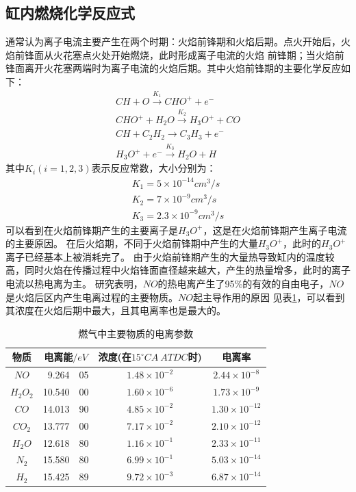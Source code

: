 \subsection{缸内燃烧化学反应式}
通常认为离子电流主要产生在两个时期：火焰前锋期和火焰后期。点火开始后，火焰前锋面从火花塞点火处开始燃烧，此时形成离子电流的火焰
前锋期；当火焰前锋面离开火花塞两端时为离子电流的火焰后期\cite{ljw2004phd}。其中火焰前锋期的主要化学反应如下：
\begin{align}
CH+O\stackrel{K_{1}}{\longrightarrow}CHO^{+}+e^{-}\\
CHO^{+}+H_{2}O\stackrel{K_{2}}{\longrightarrow}H_{3}O^{+}+CO\\
CH+C_{2}H_{2}\stackrel{}{\longrightarrow}C_{3}H_{3}+e^{-}\\
H_{3}O^{+}+e^{-}\stackrel{K_{3}}{\longrightarrow}H_{2}O+H
\end{align}
其中$K_{i}(i=1,2,3)$表示反应常数，大小分别为：
\begin{align}
K_{1}=5\times10^{-14}cm^{3}/s\\
K_{2}=7\times10^{-9}cm^{3}/s\\
K_{3}=2.3\times10^{-9}cm^{3}/s
\end{align}
可以看到在火焰前锋期产生的主要离子是$H_{3}O^{+}$，这是在火焰前锋期产生离子电流的主要原因。
在后火焰期，不同于火焰前锋期中产生的大量$H_{3}O^{+}$，此时的$H_{3}O^{+}$离子已经基本上被消耗完了。
由于火焰前锋期产生的大量热导致缸内的温度较高，同时火焰在传播过程中火焰锋面直径越来越大，产生的热量增多，此时的离子电流以热电离为主。
研究表明\cite{reinmann1997local}，$NO$的热电离产生了95\%的有效的自由电子，$NO$是火焰后区内产生电离过程的主要物质。$NO$起主导作用的原因
见表\ref{tab:nozx}，可以看到其浓度在火焰后期中最大，且其电离率也是最大的。
\begin{table}[!h]
	\centering
	\caption{燃气中主要物质的电离参数}
	\label{tab:nozx}
	\begin{tabular}{|c|rl|c|c|}
		\hline
		物质			    &    \multicolumn{2}{c|}{电离能$/eV$}    &    浓度(在$15^{\circ} CA\ ATDC$时)    &    电离率\\\hline
		$NO$    		&   9.264&05     	&$1.48 \times 10^{-2}$  &  $2.44 \times 10^{-8}$\\\hline
		$H_{2}O_{2}$    &   10.540&00 		&$1.60 \times 10^{-6}$  & $1.73 \times 10^{-9}$\\\hline
		$CO$			&	14.013&90		&$4.85 \times 10^{-2}$	& $1.30 \times 10^{-12}$\\\hline
		$CO_{2}$		&	13.777&00		&$7.17 \times 10^{-2}$	& $2.10 \times 10^{-12}$\\\hline
		$H_{2}O$		&	12.618&80		&$1.16 \times 10^{-1}$	& $2.33 \times 10^{-11}$\\\hline
		$N_{2}$			&	15.580&80		&$6.99 \times 10^{-1}$	& $5.03 \times 10^{-14}$\\\hline
		$H_{2}$			&	15.425&89		&$9.72 \times 10^{-3}$	& $6.87 \times 10^{-14}$\\\hline
	\end{tabular}
\end{table}
